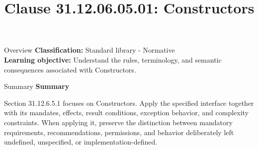 \documentclass[10pt,letterpaper]{article}
\title{Clause 31.12.06.05.01: Constructors}
\author{}
\date{}
\begin{document}
\maketitle
\begin{CornellOverviewBox}{Overview}
\textbf{Classification:} Standard library - Normative\\[2pt]
\textbf{Learning objective:} Understand the rules, terminology, and semantic consequences associated with Constructors.
\end{CornellOverviewBox}\begin{CornellSummaryBox}{Summary}
{\sffamily\bfseries\color{Accent} Summary}\par\vspace{3pt}Section 31.12.6.5.1 focuses on Constructors. Apply the specified interface together with its mandates, effects, result conditions, exception behavior, and complexity constraints. When applying it, preserve the distinction between mandatory requirements, recommendations, permissions, and behavior deliberately left undefined, unspecified, or implementation-defined.
\end{CornellSummaryBox}
\end{document}
